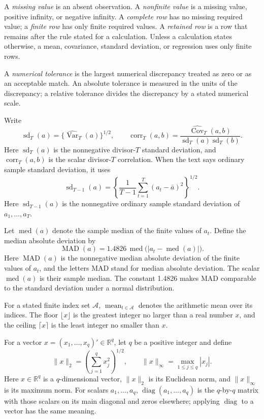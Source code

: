 \documentclass[11pt]{article}
\begin{document}
A \emph{missing value} is an absent observation. A \emph{nonfinite value} is a missing value, positive
infinity, or negative infinity. A \emph{complete row} has no missing required value; a
\emph{finite row} has only finite required values. A \emph{retained row} is a row that remains
after the rule stated for a calculation. Unless a calculation states otherwise, a mean,
covariance, standard deviation, or regression uses only finite rows.

A \emph{numerical tolerance} is the largest numerical discrepancy treated as zero or as an
acceptable match. An absolute tolerance is measured in the units of the discrepancy; a relative
tolerance divides the discrepancy by a stated numerical scale.

Write
\[
 \operatorname{sd}_T(a)=\{\widehat{\operatorname{Var}}_T(a)\}^{1/2},
 \qquad
 \operatorname{corr}_T(a,b)=
 \frac{\widehat{\operatorname{Cov}}_T(a,b)}
 {\operatorname{sd}_T(a)\operatorname{sd}_T(b)}.
\]
Here \(\operatorname{sd}_T(a)\) is the nonnegative divisor-\(T\) standard deviation, and
\(\operatorname{corr}_T(a,b)\) is the scalar divisor-\(T\) correlation. When the text says ordinary sample
standard deviation, it uses
\[
 \operatorname{sd}_{T-1}(a)=
 \left\{\frac{1}{T-1}\sum_{t=1}^{T}(a_t-\bar a)^2\right\}^{1/2}.
\]
Here \(\operatorname{sd}_{T-1}(a)\) is the nonnegative ordinary sample standard deviation of
\(a_1,\ldots,a_T\).

Let \(\operatorname{med}(a)\) denote the sample median of the finite values of \(a_t\). Define the
median absolute deviation by
\begin{equation}
 \operatorname{MAD}(a)=1.4826\,
 \operatorname{med}\bigl(|a_t-\operatorname{med}(a)|\bigr).
 \label{eq:mad}
\end{equation}
Here \(\operatorname{MAD}(a)\) is the nonnegative median absolute deviation of the finite values of
\(a_t\), and the letters MAD stand for median absolute deviation. The scalar
\(\operatorname{med}(a)\) is their sample median. The constant 1.4826 makes MAD
comparable to the standard deviation under a normal distribution.

For a stated finite index set \(\mathcal A\), \(\operatorname{mean}_{t\in\mathcal A}\) denotes the
arithmetic mean over its indices. The floor \(\lfloor x\rfloor\) is the greatest integer no larger
than a real number \(x\), and the ceiling \(\lceil x\rceil\) is the least integer no smaller than
\(x\).

For a vector \(x=(x_1,\ldots,x_q)'\in\mathbb R^q\), let \(q\) be a positive integer and
define
\[
 \|x\|_2=\left(\sum_{j=1}^q x_j^2\right)^{1/2},
 \qquad
 \|x\|_\infty=\max_{1\le j\le q}|x_j|.
\]
Here \(x\in\mathbb R^q\) is a \(q\)-dimensional vector, \(\|x\|_2\) is its Euclidean norm, and
\(\|x\|_\infty\) is its maximum norm. For scalars \(a_1,\ldots,a_q\),
\(\operatorname{diag}(a_1,\ldots,a_q)\) is the \(q\)-by-\(q\) matrix with those scalars on its
main diagonal and zeros elsewhere; applying \(\operatorname{diag}\) to a vector has the same meaning.
\end{document}
